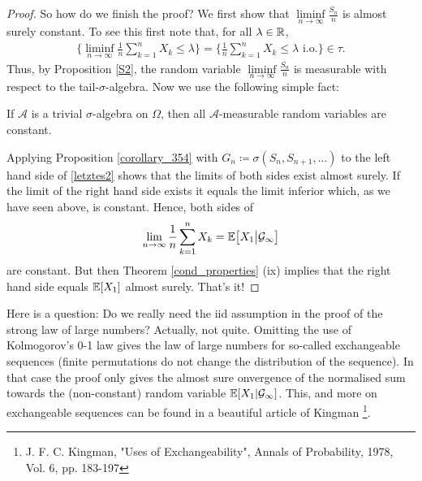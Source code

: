 \begin{proof}[Proof]
			So how do we finish the proof? We first show that $\liminf\limits_{n\to\infty}\frac{S_n}{n}$ is almost surely constant. To see this first note that, for all $\lambda\in \mathbb{R}$,
			\begin{align*}
				\Big\{ \liminf\limits_{n\to\infty}\frac{1}{n}\sum\limits_{k=1}^{n}X_k \leq \lambda \Big\} = \Big\{ \frac{1}{n}\sum\limits_{k=1}^{n}X_k \leq \lambda \text{ i.o.}\Big\} \in \tau.
			\end{align*}
			Thus, by Proposition \ref{S2}, the random variable $\liminf\limits_{n\to\infty}\frac{S_n}{n}$ is measurable with respect to the tail-$\sigma$-algebra. Now we use the following simple fact:
			\begin{luebung}
				If $\mathcal A$ is a trivial $\sigma$-algebra on $\Omega$, then all $\mathcal A$-measurable random variables are constant.
			\end{luebung}




			Applying Proposition \ref{corollary_354} with $G_n \coloneqq \sigma(S_n,S_{n+1},...)$ to the left hand side of \eqref{letztes2} shows that the limits of both sides exist almost surely. If the limit of the right hand side exists it equals the limit inferior which, as we have seen above, is constant. Hence, both sides of
			\begin{align*}
				\lim\limits_{n\to\infty}\frac{1}{n}\sum\limits_{k=1}^{n}X_k = \mathbb{E} \big[ X_1\big | \mathcal{G}_\infty\big]
			\end{align*}
			are constant. But then Theorem \ref{cond_properties} (ix) implies that the right hand side equals $\mathbb{E}[X_1]$ almost surely. That's it!
\end{proof}
Here is a question: Do we really need the iid assumption in the proof of the strong law of large numbers? Actually, not quite. Omitting the use of Kolmogorov's 0-1 law gives the law of large numbers for so-called exchangeable sequences (finite permutations do not change the distribution of the sequence). In that case the proof only gives the almost sure onvergence of the normalised sum towards the (non-constant) random variable $\mathbb{E}[X_1|\mathcal G_\infty]$. This, and more on exchangeable sequences can be found in a beautiful article of Kingman \footnote{J. F. C. Kingman, "{}Uses of Exchangeability", Annals of Probability, 1978,
Vol. 6, pp. 183-197}.



